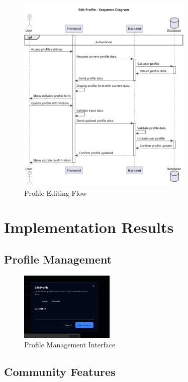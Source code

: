 \begin{figure}[H]
\centering
\includegraphics[width=0.75\textwidth]{conception/SprintV/sequence_diagrams/sequence_profileManagement_7_1_EditUserProfile.png}
\caption{Profile Editing Flow}
\label{fig:seq_edit_profile}
\end{figure}

\section{Implementation Results}
\subsection{Profile Management}

\begin{figure}[H]
\centering
\includegraphics[width=0.4\textwidth]{screenshots/edit-profile2.png}
\caption{Profile Management Interface}
\label{fig:edit_profile}
\end{figure}

\subsection{Community Features}

